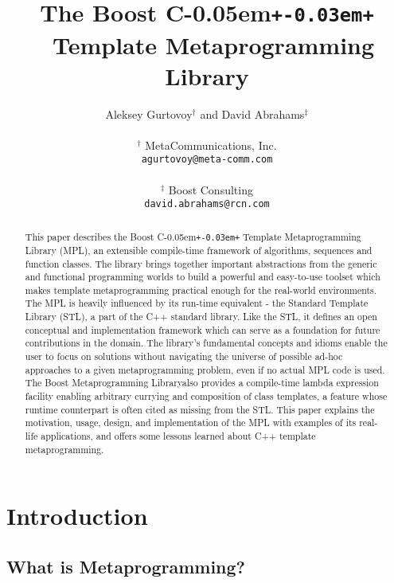 \documentclass{netobjectdays}
\newcommand{\Cpp}{C\kern-0.05em\texttt{+\kern-0.03em+}%
}
\newcommand{\Mpl}{Boost Meta\-program\-ming Library}
\newcommand{\mping}{meta\-program\-ming}
\begin{document}
\title{The Boost \Cpp\ Template Metaprogramming Library}

\author{Aleksey Gurtovoy$^\dag$ and David Abrahams$^\ddag$ \\
\\
$^\dag$ MetaCommunications, Inc. \\
\texttt{agurtovoy@meta-comm.com}\\
\\
$^\ddag$ Boost Consulting \\
\texttt{david.abrahams@rcn.com}
}

\maketitle

\begin{abstract} $\!$This paper describes the Boost \Cpp Template
Meta\-program\-ming Library (MPL), an extensible compile-time
framework of algorithms, sequences and function classes. The library
brings together important abstractions from the generic and functional
programming worlds to build a powerful and easy-to-use toolset which
makes template \mping{} practical enough for the real-world
environments. The MPL is heavily influenced by its run-time equivalent
- the Standard Template Library (STL), a part of the C++ standard
library. Like the STL, it defines an open conceptual and
implementation framework which can serve as a foundation for future
contributions in the domain. The library's fundamental concepts and
idioms enable the user to focus on solutions without navigating the
universe of possible ad-hoc approaches to a given \mping{} problem,
even if no actual MPL code is used.  The \Mpl also provides a
compile-time lambda expression facility enabling arbitrary currying
and composition of class templates, a feature whose runtime
counterpart is often cited as missing from the STL. This paper
explains the motivation, usage, design, and implementation of the MPL
with examples of its real-life applications, and offers some lessons
learned about C++ template \mping{}.
\end{abstract}


\section{Introduction}

\subsection{What is Metaprogramming?}
\end{document}
